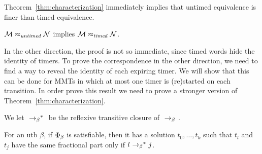 Theorem~\ref{thm:characterization} immediately implies
that untimed equivalence is finer than timed equivalence.

\begin{theorem}
\label{untimedimpliestimed}
${\mathcal M} \approx_{\mathit{untimed}} {\mathcal N}$
implies
${\mathcal M} \approx_{\mathit{timed}} {\mathcal N}$.
\end{theorem}

In the other direction, the proof is not so immediate, since timed words
hide the identity of timers. To prove the correspondence in the other direction,
we need to find a way to reveal the identity of each expiring timer.
We will show that this can be done for MMTs in which at most one timer is
(re)started on each transition. 
In order prove this result we need to prove a stronger version of
Theorem~\ref{thm:characterization}.

We let $\ {\rightarrow_{\beta}}^*\ $ be the reflexive transitive closure of
$\ \rightarrow_{\beta} \ $.

\begin{lemma}
\label{lem:transparent}
  For an utb $\beta$, if $\Phi_{\beta}$ is satisfiable, then
  it has a solution $t_0, \ldots , t_k$ such that
  $t_l$ and $t_j$ have the same fractional part only if
  $l \ {\rightarrow_{\beta}}^*\  j$.
\end{lemma}

